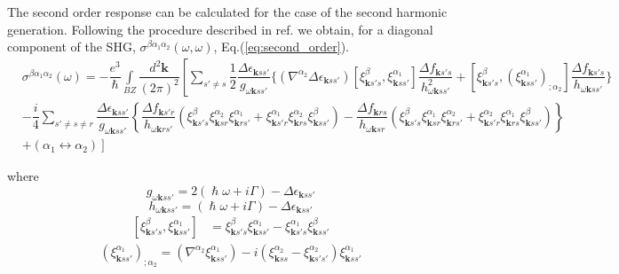 \documentclass[a4paper,12pt]{report}
\begin{document}
The second order response can be calculated for the case of the second harmonic generation.
Following the procedure described in ref. \cite{Ventura2017}
we obtain, for a diagonal component of the SHG, $\sigma^{\beta\alpha_1\alpha_2}(\omega,\omega)$, Eq.(\ref{eq:second_order}).
\begin{align}\label{eq:second_order}
 &\sigma^{\beta\alpha_1\alpha_2}(\omega) = -\dfrac{e^3}{\hslash}\int\limits_{BZ}\dfrac{d^2\pmb{k}}{(2\pi)^2}
 \left[
 \sum_{s'\ne s}\dfrac{1}{2} \dfrac{\Delta\epsilon_{\pmb{k}ss'} }{ g_{\omega\pmb{k}ss'}}
 \bigg\lbrace
 \left(\nabla^{\alpha_2} \Delta \epsilon_{\pmb{k}ss'} \right)
 \left[ \xi_{\pmb{k}s's}^{\beta},\xi_{\pmb{k}ss'}^{\alpha_1}\right]
 \dfrac{\Delta f_{\pmb{k}s's}}{  h_{\omega\pmb{k}ss'}^2 }
 + \left[ \xi_{\pmb{k}s's}^{\beta},(\xi_{\pmb{k}ss'}^{\alpha_1})_{;\alpha_2}\right]
 \dfrac{\Delta f_{\pmb{k}s's}}{  h_{\omega\pmb{k}ss'} }
 \bigg\rbrace
 \right.
 \\ \nonumber
 &-%
 \dfrac{i}{4}\sum_{s'\ne s \ne r}
 \dfrac{\Delta \epsilon_{\pmb{k}ss'} }{ g_{\omega\pmb{k}ss'} }
 \left\lbrace
   \dfrac{\Delta f_{\pmb{k}s'r}}{  h_{\omega\pmb{k}rs'} }
 \left( \xi_{\pmb{k}s's}^{\beta} \xi_{\pmb{k}sr}^{\alpha_2} \xi_{\pmb{k}rs'}^{\alpha_1}
     +  \xi_{\pmb{k}s'r}^{\alpha_1} \xi_{\pmb{k}rs}^{\alpha_2} \xi_{\pmb{k}ss'}^{\beta}\right)
 - \dfrac{\Delta f_{\pmb{k}rs }}{  h_{\omega\pmb{k}sr } }
 \left( \xi_{\pmb{k}s's}^{\beta} \xi_{\pmb{k}sr}^{\alpha_1} \xi_{\pmb{k}rs'}^{\alpha_2}
     +  \xi_{\pmb{k}s'r}^{\alpha_2} \xi_{\pmb{k}rs}^{\alpha_1} \xi_{\pmb{k}ss'}^{\beta}\right)
 \right\rbrace \\ \nonumber
 &\left. + \left( \alpha_1 \leftrightarrow \alpha_2\right)
 \right]
\end{align}

where
\begin{equation}
 g_{\omega\pmb{k}ss'} = 2(\hslash\omega + i\Gamma) - \Delta\epsilon_{\pmb{k}ss'}
\end{equation}
\begin{equation}
 h_{\omega\pmb{k}ss'} = (\hslash\omega + i\Gamma) - \Delta\epsilon_{\pmb{k}ss'}
\end{equation}
\begin{align}
  \left[ \xi_{\pmb{k}s's}^{\beta},\xi_{\pmb{k}ss'}^{\alpha_1}\right] &=
  \xi_{\pmb{k}s's}^{\beta}\xi_{\pmb{k}ss'}^{\alpha_1} - \xi_{\pmb{k}s's}^{\alpha_1}\xi_{\pmb{k}ss'}^{\beta}
\end{align}
\begin{align}
 (\xi_{\pmb{k}ss'}^{\alpha_1})_{;\alpha_2}=
  \left( \nabla^{\alpha_2} \xi_{\pmb{k}ss'}^{\alpha_1}  \right) - i\left( \xi_{\pmb{k}ss}^{\alpha_2} - \xi_{\pmb{k}s's'}^{\alpha_2}\right) \xi_{\pmb{k}ss'}^{\alpha_1}
\end{align}
\end{document}
